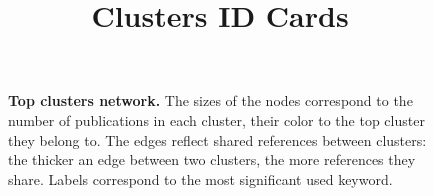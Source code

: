 \documentclass[a4paper,11pt]{report}
\title{{\bf Clusters ID Cards}}
\date{\begin{flushleft}This document gathers the ``ID Cards'' of the BC clusters found within the studied database.\\
 The BC network was built by linking pairs of publications based on the references they share - 9 out of 56 publications are in the network. The 4 clusters presented here correspond to the ones found in the top level grouping at least 0 publications. They gather a total of 9 publications. \\
 These ID cards displays the most frequent keywords, subject categories, journals of publication, institutions, countries, authors, references and reference journals of the publications of each cluster. The significance of an item $\sigma = \sqrt{N} (f - p) / \sqrt{p(1-p)}$ - where $N$ is the number of publications within the cluster and $f$ and $p$ are the proportion of publications respectively within the cluster and within the database displaying that item - is also given.\\
\vspace{1cm}
\copyright Sebastian Grauwin - BIBLIOTOOLS/BiblioTools3.2 (October 2017) \end{flushleft}}
\begin{document}
\begin{landscape}
\maketitle


\clearpage

\begin{figure}[h!]
\begin{center}
\caption{{\bf Top clusters network.} The sizes of the nodes correspond to the number of publications in each cluster, their color to the top cluster they belong to. The edges reflect shared references between clusters: the thicker an edge between two clusters, the more references they share. Labels correspond to the most significant used keyword. }
\end{center}
\end{figure}



\clearpage


\end{landscape}
\end{document}
